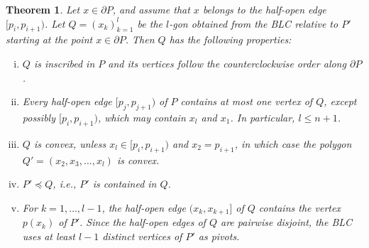 \documentclass[11pt]{amsart}
\newtheorem{theorem}{Theorem}[section]
\theoremstyle{remark}
\numberwithin{equation}{section}
\renewcommand{\precsim}{\preccurlyeq}
\renewcommand{\leq}{\leqslant}
\begin{document}
\begin{theorem}\label{allaboutQ}
Let $x\in \partial P$, and assume that $x$ belongs to the half-open edge $[p_i,p_{i+1})$. Let $Q=(x_k)_{k=1}^{l}$ be the $l$-gon obtained from the BLC relative to $P'$ starting at the point $x\in \partial P$. Then $Q$ has the following properties:
\begin{enumerate}[(i)]
\item
$Q$ is inscribed in $P$ and its vertices follow the counterclockwise order along $\partial P$.

\item
Every half-open edge $[p_j,p_{j+1})$ of $P$ contains at most one vertex of $Q$, except possibly  $[p_i,p_{i+1})$, which may contain $x_l$ and $x_1$. In particular,
$l\leq n+1$.


\item  
$Q$ is convex, unless $x_l\in [p_i,p_{i+1})$ and $x_2=p_{i+1}$, in which case  the polygon $Q'=(x_2,x_3,...,x_l)$ is convex.

\item
$P'\precsim Q$, i.e., $P'$ is contained in $Q$.


\item
For $k=1,\ldots, l-1$, the half-open edge $(x_{k},x_{k+1}]$ of $Q$ contains the vertex $p(x_k)$ of $P'$. Since the half-open edges of $Q$ are pairwise disjoint,  the BLC  uses at least $l-1$ distinct vertices of $P'$ as pivots.
\end{enumerate}
\end{theorem}
\end{document}
